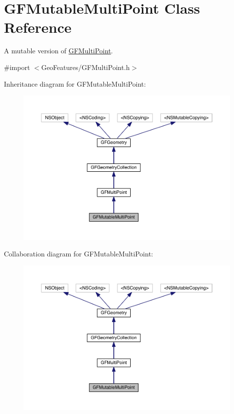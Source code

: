 \hypertarget{interface_g_f_mutable_multi_point}{}\section{G\+F\+Mutable\+Multi\+Point Class Reference}
\label{interface_g_f_mutable_multi_point}


A mutable version of \hyperlink{interface_g_f_multi_point}{G\+F\+Multi\+Point}.  




{\ttfamily \#import $<$Geo\+Features/\+G\+F\+Multi\+Point.\+h$>$}



Inheritance diagram for G\+F\+Mutable\+Multi\+Point\+:
\nopagebreak
\begin{figure}[H]
\begin{center}
\leavevmode
\includegraphics[width=350pt]{interface_g_f_mutable_multi_point__inherit__graph}
\end{center}
\end{figure}


Collaboration diagram for G\+F\+Mutable\+Multi\+Point\+:
\nopagebreak
\begin{figure}[H]
\begin{center}
\leavevmode
\includegraphics[width=350pt]{interface_g_f_mutable_multi_point__coll__graph}
\end{center}
\end{figure}
